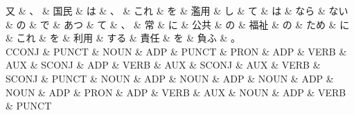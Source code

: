 \documentclass[tikz,border=5pt]{standalone}
\begin{document}
\small
\begin{dependency}[edge unit distance=7.8pt]
    \begin{deptext}[column sep=0.5em]
        又 \& 、 \& 国民 \& は \& 、 \& これ \& を \& 濫用 \& し \& て \& は \& なら \& ない \& の \& で \& あつ \& て \& 、 \& 常 \& に \& 公共 \& の \& 福祉 \& の \& ため \& に \& これ \& を \& 利用 \& する \& 責任 \& を \& 負ふ \& 。\\
        CCONJ \& PUNCT \& NOUN \& ADP \& PUNCT \& PRON \& ADP \& VERB \& AUX \& SCONJ \& ADP \& VERB \& AUX \& SCONJ \& AUX \& VERB \& SCONJ \& PUNCT \& NOUN \& ADP \& NOUN \& ADP \& NOUN \& ADP \& NOUN \& ADP \& PRON \& ADP \& VERB \& AUX \& NOUN \& ADP \& VERB \& PUNCT\\
    \end{deptext}
\end{dependency}
\end{document}
